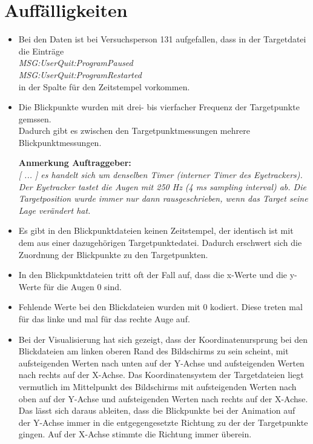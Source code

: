 \chapter{Auff\"alligkeiten}
\begin{itemize}
	\item Bei den Daten ist bei Versuchsperson 131 aufgefallen, dass in der Targetdatei die Eintr\"age\\
		\textit{MSG:UserQuit:ProgramPaused}\\
		\textit{MSG:UserQuit:ProgramRestarted}
		\\ in der Spalte f\"ur den Zeitstempel vorkommen.
	
	\item Die Blickpunkte wurden mit drei- bis vierfacher Frequenz der Targetpunkte gemssen. \\
		Dadurch gibt es zwischen den Targetpunktmessungen mehrere Blickpunktmessungen.
		
		\textbf{Anmerkung Auftraggeber:}\\
		\textit{[ ... ] es handelt sich um denselben Timer (interner Timer des Eyetrackers). Der Eyetracker tastet die Augen mit 250 Hz (4 ms sampling interval) ab. Die Targetposition wurde immer nur dann rausgeschrieben, wenn das Target seine Lage ver\"andert hat.}
	
	\item Es gibt in den Blickpunktdateien keinen Zeitstempel, der identisch ist mit dem aus einer dazugeh\"origen Targetpunktedatei. Dadurch erschwert sich die Zuordnung der Blickpunkte zu den Targetpunkten.
	
	\item In den Blickpunktdateien tritt oft der Fall auf, dass die x-Werte und die y-Werte f\"ur die Augen 0 sind.
	
	\item Fehlende Werte bei den Blickdateien wurden mit 0 kodiert. Diese treten mal f\"ur das linke und mal f\"ur das rechte Auge auf.
	
	\item Bei der Visualisierung hat sich gezeigt, dass der Koordinatenursprung bei den Blickdateien am linken oberen Rand des Bildschirms zu sein scheint, mit aufsteigenden Werten nach unten auf der Y-Achse und aufsteigenden Werten nach rechts auf der X-Achse. Das Koordinatensystem der Targetdateien liegt vermutlich im Mittelpunkt des Bildschirms mit aufsteigenden Werten nach oben auf der Y-Achse und aufsteigenden Werten nach rechts auf der X-Achse. Das l\"asst sich daraus ableiten, dass die Blickpunkte bei der Animation auf der Y-Achse immer in die entgegengesetzte Richtung zu der der Targetpunkte gingen. Auf der X-Achse stimmte die Richtung immer \"uberein.
	

\end{itemize}
